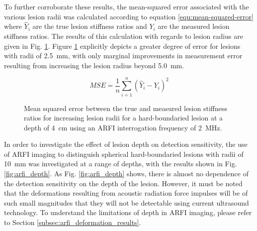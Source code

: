 			To further corroborate these results, the mean-squared error associated with the various lesion radii was calculated according to equation \ref{equ:mean-squared-error} where $\hat{Y}_i$ are the true lesion stiffness ratios and $Y_i$ are the measured lesion stiffness ratios. The results of this calculation with regards to lesion radius are given in Fig. \ref{fig:arfi_radius_mse}. Figure \ref{fig:arfi_radius_mse} explicitly depicts a greater degree of error for lesions with radii of \SI{2.5}{\mm}, with only marginal improvements in measurement error resulting from increasing the lesion radius beyond \SI{5.0}{\mm}.

			\begin{equation}
				\label{equ:mean-squared-error}
				MSE = \frac{1}{n}\sum_{i=1}^n \left(\hat{Y}_i - Y_i\right)^2
			\end{equation}

			\begin{figure}[!htb]
				\centering
				\caption[ARFI imaging-acquired lesion stiffness mean squared error related to lesion radius]{Mean squared error between the true and measured lesion stiffness ratios for increasing lesion radii for a hard-boundaried lesion at a depth of \SI{4}{\cm} using an ARFI interrogation frequency of \SI{2}{\MHz}.}
				\label{fig:arfi_radius_mse}
			\end{figure}


			In order to investigate the effect of lesion depth on detection sensitivity, the use of ARFI imaging to distinguish spherical hard-boundaried lesions with radii of \SI{10}{\mm} was investigated at a range of depths, with the results shown in Fig. \ref{fig:arfi_depth}. As Fig. \ref{fig:arfi_depth} shows, there is almost no dependence of the detection sensitivity on the depth of the lesion. However, it must be noted that the deformations resulting from acoustic radiation force impulses will be of such small magnitudes that they will not be detectable using current ultrasound technology. To understand the limitations of depth in ARFI imaging, please refer to Section \ref{subsec:arfi_deformation_results}.

